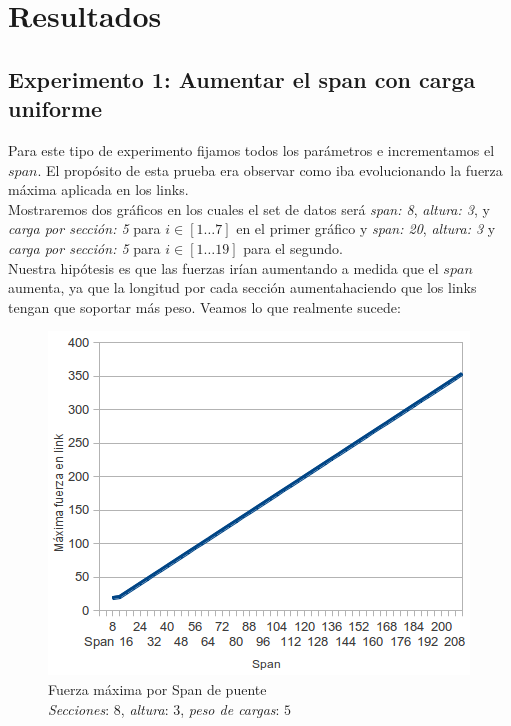 \section{Resultados}
\subsection{Experimento 1: Aumentar el span con carga uniforme}

Para este tipo de experimento fijamos todos los parámetros e incrementamos el $span$. El propósito de esta prueba era observar como iba evolucionando la fuerza máxima aplicada en los links.\\

Mostraremos dos gráficos en los cuales el set de datos será \textit{span: 8},
\textit{altura: 3}, y \textit{carga por sección: 5} para $i \in [1 \dots 7]$ en el primer gráfico y 
\textit{span: 20}, \textit{altura: 3} y \textit{carga por sección: 5} para $i \in [1 \dots 19]$ para el segundo.\\

Nuestra hipótesis es que las fuerzas irían aumentando a medida que el $span$ 
aumenta, ya que la longitud por cada sección aumentahaciendo que los links tengan que soportar más peso. Veamos lo que realmente sucede:

\begin{figure}[h!]
	\begin{center}
	\includegraphics[scale=0.8]{archivos/graficos/Fuerza-x-span.png}
	\caption{\label{fig:fuerza_x_span}Fuerza máxima por Span de puente\\  \textit{Secciones}: $8$, \textit{altura}: $3$, \textit{peso de cargas}: $5$}
	\end{center}
\end{figure}

